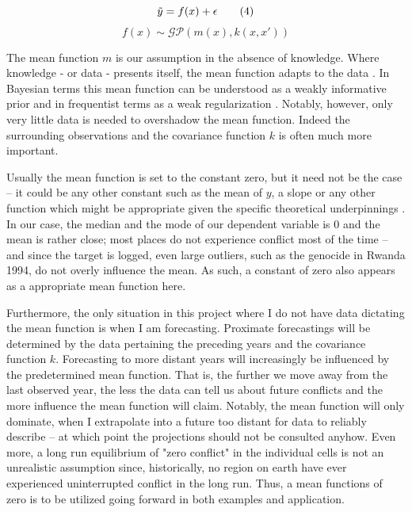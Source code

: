 \documentclass[a4paper]{article}
\begin{document}
\[
\Tilde{y} = f(x) + \epsilon  \tag{4} \label{eq:y}
\]
\[
f(x) \sim \mathcal{GP}(m(x),k(x,x'))  \tag{5} \label{eq:f}
\]

The mean function $m$ is our assumption in the absence of knowledge. Where knowledge - or data - presents itself, the mean function adapts to the data \citep[3-4]{williams2006gaussian}. In Bayesian terms this mean function can be understood as a weakly informative prior and in frequentist terms as a weak regularization \citep[35]{Mcelreath_2018}. Notably, however, only very little data is needed to overshadow the mean function. Indeed the surrounding observations and the covariance function $k$ is often much more important.\par

Usually the mean function is set to the constant zero, but it need not be the case -- it could be any other constant such as the mean of $y$, a slope or any other function which might be appropriate given the specific theoretical underpinnings \citep[28-29]{williams2006gaussian}. In our case, the median and the mode of our dependent variable is 0 and the mean is rather close; most places do not experience conflict most of the time -- and since the target is logged, even large outliers, such as the genocide in Rwanda 1994, do not overly influence the mean. As such, a constant of zero also appears as a appropriate mean function here.\par

Furthermore, the only situation in this project where I do not have data dictating the mean function is when I am forecasting. Proximate forecastings will be determined by the data pertaining the preceding years and the covariance function $k$. Forecasting to more distant years will increasingly be influenced by the predetermined mean function. That is, the further we move away from the last observed year, the less the data can tell us about future conflicts and the more influence the mean function will claim. Notably, the mean function will only dominate, when I extrapolate into a future too distant for data to reliably describe -- at which point the projections should not be consulted anyhow. Even more, a long run equilibrium of "zero conflict" in the individual cells is not an unrealistic assumption since, historically, no region on earth have ever experienced uninterrupted conflict in the long run. Thus, a mean functions of zero is to be utilized going forward in both examples and application.\par
\end{document}
